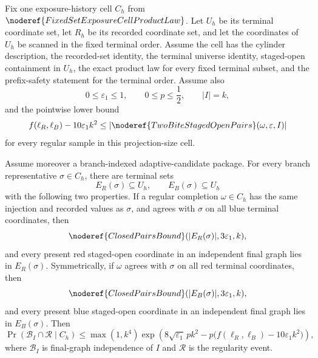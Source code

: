 \begin{helper}
Fix one exposure-history cell \(C_h\) from
\(\noderef{FixedSetExposureCellProductLaw}\).  Let \(U_h\) be its terminal
coordinate set, let \(R_h\) be its recorded coordinate set, and let the
coordinates of \(U_h\) be scanned in the fixed terminal order.  Assume the
cell has the cylinder description, the recorded-set identity, the terminal
universe identity, staged-open containment in \(U_h\), the exact product law
for every fixed terminal subset, and the prefix-safety statement for the
terminal order.  Assume also
\[
0\le \varepsilon_1\le 1,\qquad 0\le p\le \frac12,\qquad |I|=k,
\]
and the pointwise lower bound
\[
f(\ell_R,\ell_B)-10\varepsilon_1k^2
\le |\noderef{TwoBiteStagedOpenPairs}(\omega,\varepsilon,I)|
\]
for every regular sample in this projection-size cell.

Assume moreover a branch-indexed adaptive-candidate package.  For every
branch representative \(\sigma\in C_h\), there are terminal sets
\[
E_R(\sigma)\subseteq U_h,\qquad E_B(\sigma)\subseteq U_h
\]
with the following two properties.  If a regular completion \(\omega\in C_h\)
has the same injection and recorded values as \(\sigma\), and agrees with
\(\sigma\) on all blue terminal coordinates, then
\[
\noderef{ClosedPairsBound}(|E_R(\sigma)|,3\varepsilon_1,k),
\]
and every present red staged-open coordinate in an independent final graph
lies in \(E_R(\sigma)\).  Symmetrically, if \(\omega\) agrees with
\(\sigma\) on all red terminal coordinates, then
\[
\noderef{ClosedPairsBound}(|E_B(\sigma)|,3\varepsilon_1,k),
\]
and every present blue staged-open coordinate in an independent final graph
lies in \(E_B(\sigma)\).  Then
\[
\Pr(\mathcal B_I\cap\mathcal R\mid C_h)
\le
\max(1,k^4)\exp\!\left(
8\sqrt{\varepsilon_1}\,pk^2
-p\bigl(f(\ell_R,\ell_B)-10\varepsilon_1k^2\bigr)\right),
\]
where \(\mathcal B_I\) is final-graph independence of \(I\) and
\(\mathcal R\) is the regularity event.
\end{helper}
